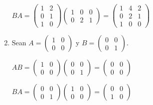 \documentclass[12pt]{article}
\begin{document}
\begin{description}
\begin{enumerate}
\begin{math}
B A = 
\begin{pmatrix}
1 & 2 \\
0 & 1 \\
1 & 0
\end{pmatrix}
\begin{pmatrix}
1 & 0 & 0 \\
0 & 2 & 1
\end{pmatrix}
=
\begin{pmatrix}
1 & 4 & 2 \\
0 & 2 & 1 \\
1 & 0 & 0
\end{pmatrix}
\end{math}

\item
Sean
\begin{math}
A =
\begin{pmatrix}
1 & 0 \\
0 & 0
\end{pmatrix}
\end{math}
 y 
 \begin{math}
B =
\begin{pmatrix}
0 & 0 \\
0 & 1
\end{pmatrix}
\end{math}.

\begin{math}
A B = 
\begin{pmatrix}
1 & 0 \\
0 & 0
\end{pmatrix}
\begin{pmatrix}
0 & 0 \\
0 & 1
\end{pmatrix}
=
\begin{pmatrix}
0 & 0 \\
0 & 0
\end{pmatrix}
\end{math}

\begin{math}
B A = 
\begin{pmatrix}
0 & 0 \\
0 & 1
\end{pmatrix}
\begin{pmatrix}
1 & 0 \\
0 & 0
\end{pmatrix}
=
\begin{pmatrix}
0 & 0 \\
1 & 0
\end{pmatrix}
\end{math}


\end{enumerate}
\end{description}
\end{document}
